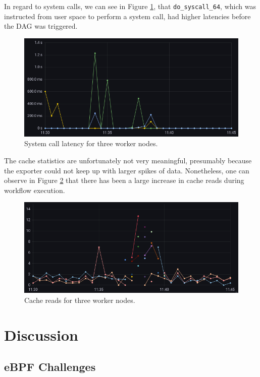 \documentclass[lettersize,journal]{IEEEtran}
\begin{document}
	In regard to system calls, we can see in Figure \ref{fig:results:syscalls}, that \texttt{do\_syscall\_64}, which was instructed from user space to perform a system call, had higher latencies before the DAG was triggered.
	\begin{figure}[h]
		\includegraphics[width=\linewidth]{images/results_syscalls_total.png}
		\caption{System call latency for three worker nodes.}
		\label{fig:results:syscalls}
	\end{figure}
	
	The cache statistics are unfortunately not very meaningful, presumably because the exporter could not keep up with larger spikes of data. Nonetheless, one can observe in Figure \ref{fig:results:cachestat} that there has been a large increase in cache reads during workflow execution.
	\begin{figure}[h]
		\includegraphics[width=\linewidth]{images/results_cachestat_access.png}
		\caption{Cache reads for three worker nodes.}
		\label{fig:results:cachestat}
	\end{figure}
	
	\section{Discussion}
	\subsection{eBPF Challenges}
\end{document}

